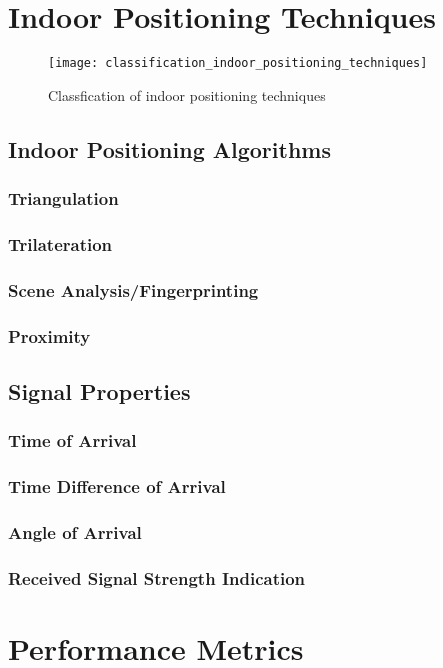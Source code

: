 \section{Indoor Positioning Techniques}
\begin{figure}[h!]
\centering
\texttt{[image: classification\_indoor\_positioning\_techniques]}
\caption{Classfication of indoor positioning techniques~\cite{Sakpere2017}}
\label{fig:ips_techniques}
\end{figure}
\subsection{Indoor Positioning Algorithms}
\subsubsection{Triangulation}
\subsubsection{Trilateration}
\subsubsection{Scene Analysis/Fingerprinting}
\subsubsection{Proximity}
\subsection{Signal Properties}
\subsubsection{Time of Arrival}
\subsubsection{Time Difference of Arrival}
\subsubsection{Angle of Arrival}
\subsubsection{Received Signal Strength Indication}
\section{Performance Metrics}
